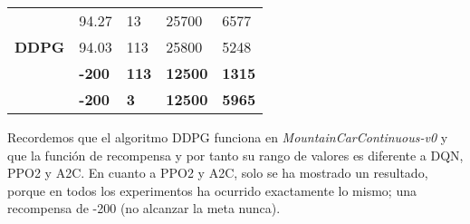 \documentclass[11pt,fleqn]{book} %
\begin{document}
\begin{table}[H]
\begin{tabular}{l|l|l|l|l|}
		\multicolumn{1}{|l|}{\cellcolor[HTML]{C7DCB4}}                                & 94.27                                                                                                                          & 13                                                                                   & 25700                                                                                                                    & 6577                                              \\ \cline{2-5} 
		\multicolumn{1}{|l|}{\multirow{-3}{*}{\cellcolor[HTML]{C7DCB4}\textbf{DDPG}}} & 94.03                                                                                                                          & 113                                                                                  & 25800                                                                                                                    & 5248                                              \\ \hline
		\rowcolor[HTML]{FFCCC9} 
		\multicolumn{1}{|l|}{\cellcolor[HTML]{C7DCB4}\textbf{PPO2}}                   & \textbf{-200}                                                                                                                  & \textbf{113}                                                                         & \textbf{12500}                                                                                                           & \textbf{1315}                                     \\ \hline
		\rowcolor[HTML]{FFCCC9} 
		\multicolumn{1}{|l|}{\cellcolor[HTML]{C7DCB4}\textbf{A2C}}                    & \textbf{-200}                                                                                                                  & \textbf{3}                                                                           & \textbf{12500}                                                                                                           & \textbf{5965}                                     \\ \hline
	\end{tabular}
\end{table}

Recordemos que el algoritmo DDPG funciona en \textit{MountainCarContinuous-v0} y que la función de recompensa y por tanto su rango de valores es diferente a DQN, PPO2 y A2C. En cuanto a PPO2 y A2C, solo se ha mostrado un resultado, porque en todos los experimentos ha ocurrido exactamente lo mismo; una recompensa de -200 (no alcanzar la meta nunca).\\
\end{document}
